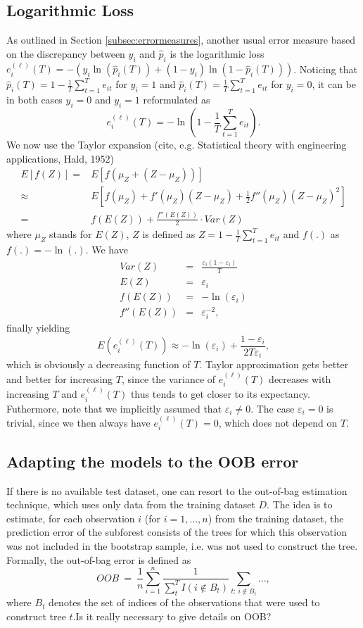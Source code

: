 \documentclass[paper=a4
               ,12pt
               ,DIV=12
               ,parskip=half
               ,titlepage=on
               ,headinclude 
               ,footinclude
               ,headsepline
               ,footsepline         %
               ,ilines 
               ]{scrartcl}
\begin{document}
\subsection{Logarithmic Loss}
As outlined in Section \ref{subsec:errormeasures}, another usual error measure based on the discrepancy between $y_i$ and $\hat{p}_i$ is the logarithmic loss $e_i^{(\ell)}(T)=-(y_i\ln (\hat{p}_i(T))+(1-y_i)\ln (1-\hat{p}_i(T)))$. 
Noticing that $\hat{p}_i(T)=1-\frac{1}{T}\sum_{t=1}^Te_{it}$ for $y_i=1$ and $\hat{p}_i(T)=\frac{1}{T}\sum_{t=1}^Te_{it}$ for $y_i=0$, it can be in both cases $y_i=0$ and $y_i=1$ reformulated as
\[
e_i^{(\ell)}(T) =  -\ln (1-\frac{1}{T}\sum_{t=1}^T e_{it}).
\]
We now use the Taylor expansion  (cite, e.g. Statistical theory with engineering applications, Hald, 1952)
\begin{align}
E\left[f(Z)\right]  {} = & E\left[f(\mu_Z + \left(Z - \mu_Z\right))\right] \nonumber \\
\approx & E \left[f(\mu_Z) + f'(\mu_Z)\left(Z-\mu_Z\right) + \frac{1}{2}f''(\mu_Z) \left(Z - \mu_Z\right)^2 \right] \nonumber \\
 = & f(E(Z)) + \frac{f''(E(Z))}{2} \cdot Var(Z) \nonumber
\end{align}
where $\mu_Z$ stands for $E(Z)$, $Z$ is defined as $Z=1-\frac{1}{T}\sum_{t=1}^T e_{it}$ and $f(.)$ as $f(.)=-\ln (.)$.
We have
\begin{eqnarray}
Var(Z) & = & \frac{\varepsilon_i(1-\varepsilon_i)}{T}\\
E(Z) & = & \varepsilon_i \\
f(E(Z)) & = & -\ln(\varepsilon_i) \\
f''(E(Z)) & = & \varepsilon_i^{-2},
\end{eqnarray}
finally yielding
\[
E(e_i^{(\ell)}(T)) \approx  -\ln (\varepsilon_i)+\frac{1-\varepsilon_i}{2T\varepsilon_i},
\]
which is obviously a decreasing function of $T$. Taylor approximation gets better and better for increasing $T$, since the variance of $e_i^{(\ell)}(T)$ decreases with increasing $T$ and $e_i^{(\ell)}(T)$ thus tends to get closer to its expectancy. Futhermore, note that we implicitly assumed that $\varepsilon_i\neq 0$. The case $\varepsilon_i=0$ is trivial, since we then always have $e_i^{(\ell)}(T)=0$, which does not depend on $T$.

\subsection{Adapting the models to the OOB error}
If there is no available test dataset, one can resort to the out-of-bag estimation technique, which uses only data from the training dataset $D$. The idea is to estimate, for each observation $i$ (for $i=1,\dots,n$) from the training dataset, the prediction error of the subforest consists of the trees for which this observation was not included in the bootstrap sample, i.e. was not used to construct the tree. Formally, the out-of-bag error is defined as
\[
OOB\ =\ \frac{1}{n}\sum_{i=1}^n\frac{1}{\sum_{t}^TI(i\notin B_t)}\sum_{t:\ i\notin B_t}...,
\]
where $B_t$ denotes the set of indices of the observations that were used to construct tree $t$.Is it really necessary to give details on OOB?
\end{document}
